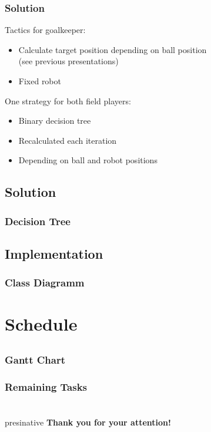 \documentclass[hyperref={pdfpagelabels=false}]{beamer}
\begin{document}
\begin{frame}
    \frametitle{Solution}
    Tactics for goalkeeper:\\
    \begin{itemize}
        \item Calculate target position depending on ball position\\
        (see previous presentations)
        \item Fixed robot
    \end{itemize}
    
    One strategy for both field players:\\
    \begin{itemize}
        \item Binary decision tree
        \item Recalculated each iteration
        \item Depending on ball and robot positions
    \end{itemize}

\end{frame}

\subsection{Solution}
\begin{frame}
    \frametitle{Decision Tree}
    \begin{center}
        
    \end{center}
\end{frame}

\subsection{Implementation}
\begin{frame}
    \frametitle{Class Diagramm}
    \begin{center}
        
    \end{center}
\end{frame}

\section{Schedule}
\subsection{}
\begin{frame}
    \frametitle{Gantt Chart}
\end{frame}

\begin{frame}
    \frametitle{Remaining Tasks}
\end{frame}

\section{}
\begin{frame}
	\hfill
	\begin{beamercolorbox}[shadow=true, rounded=true, wd=10cm]{presinative}
		\centering
		\Large{\textbf{Thank you for your attention!}}
	\end{beamercolorbox}
	\hfill
\end{frame}
\end{document}
